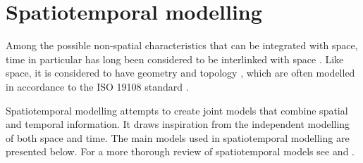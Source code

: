\section{Spatiotemporal modelling}
\label{se:modelling-time}

Among the possible non-spatial characteristics that can be integrated with space, time in particular has long been considered to be interlinked with space \citep{Akhundov86}.
Like space, it is considered to have geometry and topology \citep{Earman77}, which are often modelled in accordance to the ISO 19108 standard \citep{ISO19108:2002}.

Spatiotemporal modelling attempts to create joint models that combine spatial and temporal information.
It draws inspiration from the independent modelling of both space and time.
The main models used in spatiotemporal modelling are presented below.
For a more thorough review of spatiotemporal models see \citet{Al-Taha94} and \citet{Pelekis04}.

